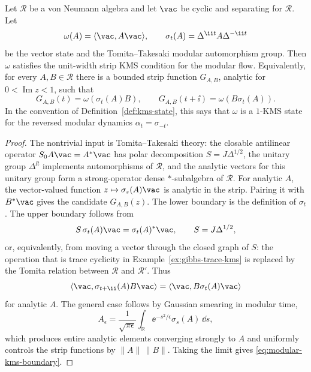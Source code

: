 \begin{theorem}
\label{thm:modular-kms-property}
Let \(\mathcal R\) be a von Neumann algebra and let \(\vac\) be cyclic and
separating for \(\mathcal R\).  Let
\[
  \omega(A)=\langle\vac,A\vac\rangle,
  \qquad
  \sigma_t(A)=\Delta^{\ii t}A\Delta^{-\ii t}
\]
be the vector state and the Tomita--Takesaki modular automorphism group.
Then \(\omega\) satisfies the unit-width strip KMS condition for the modular
flow.  Equivalently, for every \(A,B\in\mathcal R\) there is a bounded strip
function \(G_{A,B}\), analytic for \(0<\operatorname{Im}z<1\), such that
\begin{equation}
  G_{A,B}(t)=\omega(\sigma_t(A)B),
  \qquad
  G_{A,B}(t+\ii)=\omega(B\sigma_t(A)).
  \label{eq:modular-kms-boundary}
\end{equation}
In the convention of Definition~\ref{def:kms-state}, this says that
\(\omega\) is a \(1\)-KMS state for the reversed modular dynamics
\(\alpha_t=\sigma_{-t}\).
\end{theorem}

\begin{proof}
The nontrivial input is Tomita--Takesaki theory: the closable antilinear
operator \(S_0A\vac=A^*\vac\) has polar decomposition
\(S=J\Delta^{1/2}\), the unitary group \(\Delta^{\ii t}\) implements
automorphisms of \(\mathcal R\), and the analytic vectors for this unitary
group form a strong-operator dense \(*\)-subalgebra of \(\mathcal R\).  For
analytic \(A\), the vector-valued function
\(z\mapsto\sigma_z(A)\vac\) is analytic in the strip.  Pairing it with
\(B^*\vac\) gives the candidate \(G_{A,B}(z)\).  The lower boundary is the
definition of \(\sigma_t\).  The upper boundary follows from
\[
  S\,\sigma_t(A)\vac=\sigma_t(A)^*\vac,
  \qquad
  S=J\Delta^{1/2},
\]
or, equivalently, from moving a vector through the closed graph of \(S\):
the operation that is trace cyclicity in
Example~\ref{ex:gibbs-trace-kms} is replaced by the Tomita relation
between \(\mathcal R\) and \(\mathcal R'\).  Thus
\[
  \langle\vac,\sigma_{t+\ii}(A)B\vac\rangle
  =
  \langle\vac,B\sigma_t(A)\vac\rangle
\]
for analytic \(A\).  The general case follows by Gaussian smearing in modular
time,
\[
  A_\epsilon
  =
  \frac1{\sqrt{\pi\epsilon}}
  \int_{\mathbb R}\ee^{-s^2/\epsilon}\sigma_s(A)\,\dd s ,
\]
which produces entire analytic elements converging strongly to \(A\) and
uniformly controls the strip functions by \(\|A\|\,\|B\|\).  Taking the limit
gives \eqref{eq:modular-kms-boundary}.
\end{proof}

